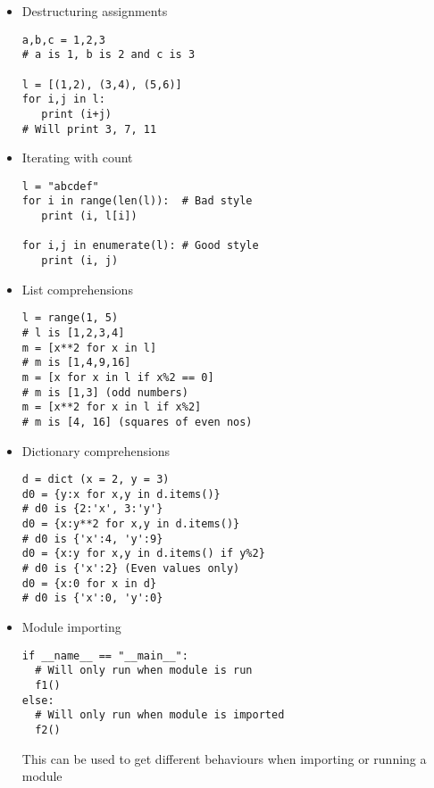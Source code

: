 \begin{itemize}
\item Destructuring assignments
\begin{lstlisting}
a,b,c = 1,2,3
# a is 1, b is 2 and c is 3

l = [(1,2), (3,4), (5,6)]
for i,j in l:
   print (i+j)
# Will print 3, 7, 11
\end{lstlisting}
\item Iterating with count
  \begin{lstlisting}
l = "abcdef"
for i in range(len(l)):  # Bad style
   print (i, l[i])

for i,j in enumerate(l): # Good style
   print (i, j)
  \end{lstlisting}
\item List comprehensions
  \begin{lstlisting}
l = range(1, 5)
# l is [1,2,3,4]
m = [x**2 for x in l] 
# m is [1,4,9,16]
m = [x for x in l if x%2 == 0] 
# m is [1,3] (odd numbers)
m = [x**2 for x in l if x%2]
# m is [4, 16] (squares of even nos)
  \end{lstlisting}
\item Dictionary comprehensions
  \begin{lstlisting}
d = dict (x = 2, y = 3)
d0 = {y:x for x,y in d.items()}
# d0 is {2:'x', 3:'y'}
d0 = {x:y**2 for x,y in d.items()}
# d0 is {'x':4, 'y':9}
d0 = {x:y for x,y in d.items() if y%2}
# d0 is {'x':2} (Even values only)
d0 = {x:0 for x in d}
# d0 is {'x':0, 'y':0}
  \end{lstlisting}
\item Module importing
\begin{lstlisting}
if __name__ == "__main__":
  # Will only run when module is run
  f1()
else:
  # Will only run when module is imported
  f2()  
\end{lstlisting}

This can be used to get different behaviours when importing or running
a module
\end{itemize}
